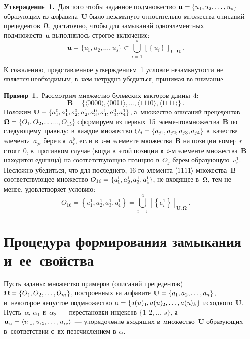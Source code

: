 \begin{multicols}{2}
    \smallskip
    
    \noindent
    \textbf{Утверждение~1.}\ Для того чтобы заданное подмножество 
$\mathbf{u}\hm= \{u_1, u_2, \ldots, u_s\}$ образующих из 
алфавита~$\mathbf{U}$ было незамкнуто относительно множества 
описаний прецедентов~${\boldsymbol{\Omega}}$, достаточно, чтобы для замыканий 
одноэлементных подмножеств~$\mathbf{u}$ выполнялось строгое 
включение: 
    $$
\mathbf{u}= \{u_1, u_2, \ldots, u_s\} \subset 
\mathop{\bigcup}\limits_{i=1}^s \left[ 
\left\{ u_i\right\}\right]_{\mathbf{U},{\boldsymbol{\Omega}}}\,.
    $$
  
  К сожалению, представленное утверждением~1 условие незамкнутости не 
является необходимым, в~чем нетрудно убедиться, принимая во внимание
  
  \smallskip
  
  \noindent
  \textbf{Пример~1.}\ Рассмотрим множество булевских векторов длины~4: 
$$
\mathbf{B} = \{\langle0000\rangle, \langle0001\rangle, \ldots, 
\langle1110\rangle, \langle1111\rangle\}\,.
$$
 Положим $\mathbf{U}
\hm=  \{a^0_1, 
a^1_1, a^0_2, a^1_2, a^0_3, a^1_3, a^0_4, a^1_4\}$, а~множество описаний прецедентов 
${\boldsymbol{\Omega}}\hm= \{O_1, O_2,\ldots$\linebreak $\ldots, O_{15}\}$ сформируем из 
первых~15~элементов\linebreak множества~$\mathbf{B}$ по следующему правилу: 
в~каждое множество $O_j \hm= \{a_{j1}, a_{j2}, a_{j3}, a_{j4}\}$ в~качестве 
элемента~$a_{jr}$ берется~$a^0_r$, если в~$i$-м элементе 
множества~$\mathbf{B}$ на позиции номер~$r$ стоит~0, в~противном 
случае (когда в~этой позиции в~$i$-м элементе множества~$\mathbf{B}$
находится единица) на соответствующую позицию в~$O_j$ берем 
образующую~$a^1_r$. Несложно убедиться, что для последнего, 16-го 
элемента $\langle1111\rangle$ множества~$\mathbf{B}$ соответствующее 
множество $O_{16}\hm=  \{a^1_1, a^1_2, a^1_3, a^1_4\}$, не входящее в~${\boldsymbol{\Omega}}$, 
тем не менее, удовлетворяет условию:
  $$
  O_{16}= \left\{ a^1_1, a^1_2, a^1_3, a^1_4\right\} = \mathop{\bigcup}\limits_{i=1}^4 \left[ 
\left\{a^1_i\right\}\right]_{\mathbf{U},{\boldsymbol{\Omega}}}\,.
  $$
  
\section{Процедура формирования замыкания и~ее~свойства}

    Пусть заданы: множество примеров (описаний прецедентов) 
${\boldsymbol{\Omega}}\hm= \{O_1, O_2, \ldots, O_m\}$, построенных на алфавите 
$\mathbf{U}\hm= \{a_1,a_2, \ldots, a_n\}$, и~некоторое непустое 
подмножество $\mathbf{u}\hm= \{a(u)_1, a(u)_2, \ldots, a(u)_k\}$ 
исходного~$\mathbf{U}$. Пусть~$\alpha$, $\alpha_1$ и~$\alpha_2$~---
перестановки индексов $\{1, 2, \ldots, s\}$, а~$\mathbf{u}_\alpha\hm= \langle 
u_{i1}, u_{i2}, \ldots, u_{is}\rangle$~--- упорядочение входящих 
в~множество~$\mathbf{U}$ обра\-зу\-ющих в~соответствии с~их перечислением 
в~$\alpha$. 
    \smallskip
    

\end{multicols}
